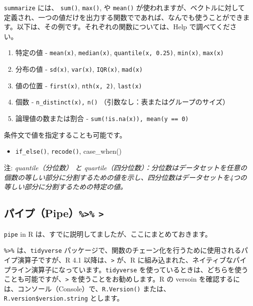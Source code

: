 \documentclass[
  xelatex, ja=standard]{bxjsbook}
\providecommand{\tightlist}{%
  \setlength{\itemsep}{0pt}\setlength{\parskip}{0pt}}
\theoremstyle{definition}
\theoremstyle{definition}
\theoremstyle{definition}
\theoremstyle{definition}
\theoremstyle{remark}
\begin{document}
\texttt{summarize} には、 \texttt{sum()}, \texttt{max()}, や \texttt{mean()} が使われますが、ベクトルに対して定義され、一つの値だけを出力する関数でであれば、なんでも使うことができます。以下は、その例です。それぞれの関数については、Help で調べてください。

\begin{enumerate}
\def\labelenumi{\arabic{enumi}.}
\item
  特定の値 - \texttt{mean(x)}, \texttt{median(x)}, \texttt{quantile(x,\ 0.25)}, \texttt{min(x)}, \texttt{max(x)}
\item
  分布の値 - \texttt{sd(x)}, \texttt{var(x)}, \texttt{IQR(x)}, \texttt{mad(x)}
\item
  値の位置 - \texttt{first(x)}, \texttt{nth(x,\ 2)}, \texttt{last(x)}
\item
  個数 - \texttt{n\_distinct(x),} \texttt{n()} （引数なし：表またはグループのサイズ）
\item
  論理値の数または割合 - \texttt{sum(!is.na(x)),\ mean(y\ ==\ 0)}
\end{enumerate}

条件文で値を指定することも可能です。

\begin{itemize}
\tightlist
\item
  \texttt{if\_else()}, \texttt{recode()}, case\_when()
\end{itemize}

注: \emph{quantile（分位数） と quartile（四分位数）：分位数はデータセットを任意の個数の等しい部分に分割するための値を示し、四分位数はデータセットを4つの等しい部分に分割するための特定の値。}

\hypertarget{ux30d1ux30a4ux30d7pipe}{%
\subsection{\texorpdfstring{パイプ（Pipe）\texttt{\%\textgreater{}\%} \texttt{\textbar{}\textgreater{}}}{パイプ（Pipe）\%\textgreater\% \textbar\textgreater{}}}\label{ux30d1ux30a4ux30d7pipe}}

\texttt{pipe} in R は、すでに説明してましたが、ここにまとめておきます。

\texttt{\%\textgreater{}\%} は、\texttt{tidyverse} パッケージで、関数のチェーン化を行うために使用されるパイプ演算子ですが、R 4.1 以降は、\texttt{\textbar{}\textgreater{}} が、R に組み込まれた、ネイティブなパイプライン演算子になっています。\texttt{tidyverse} を使っているときは、どちらを使うことも可能ですが、\texttt{\textbar{}\textgreater{}} を使うことをお勧めします。R の versoin を確認するには、コンソール（Console）で、\texttt{R.Version()} または、\texttt{R.version\$version.string} とします。
\end{document}
